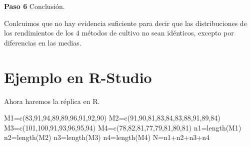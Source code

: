\documentclass[
  a4paper,
  oneside,
  openany]{book}
\newenvironment{Shaded}{\begin{snugshade}}{\end{snugshade}}
\newcommand{\DecValTok}[1]{\textcolor[rgb]{0.00,0.00,0.81}{#1}}
\newcommand{\FunctionTok}[1]{\textcolor[rgb]{0.00,0.00,0.00}{#1}}
\newcommand{\NormalTok}[1]{#1}
\newcommand{\OtherTok}[1]{\textcolor[rgb]{0.56,0.35,0.01}{#1}}
\newcommand{\SpecialCharTok}[1]{\textcolor[rgb]{0.00,0.00,0.00}{#1}}
\begin{document}
\textbf{Paso 6} Conclusión.

Conlcuimos que no hay evidencia suficiente para decir que las distribuciones de los rendimientos de los 4 métodos de cultivo no sean idénticos, excepto por diferencias en las medias.

\hypertarget{ejemplo-en-r-studio-8}{%
\section{Ejemplo en R-Studio}\label{ejemplo-en-r-studio-8}}

Ahora haremos la réplica en R.

\begin{Shaded}
\begin{Highlighting}[]
\NormalTok{M1}\OtherTok{=}\FunctionTok{c}\NormalTok{(}\DecValTok{83}\NormalTok{,}\DecValTok{91}\NormalTok{,}\DecValTok{94}\NormalTok{,}\DecValTok{89}\NormalTok{,}\DecValTok{89}\NormalTok{,}\DecValTok{96}\NormalTok{,}\DecValTok{91}\NormalTok{,}\DecValTok{92}\NormalTok{,}\DecValTok{90}\NormalTok{)}
\NormalTok{M2}\OtherTok{=}\FunctionTok{c}\NormalTok{(}\DecValTok{91}\NormalTok{,}\DecValTok{90}\NormalTok{,}\DecValTok{81}\NormalTok{,}\DecValTok{83}\NormalTok{,}\DecValTok{84}\NormalTok{,}\DecValTok{83}\NormalTok{,}\DecValTok{88}\NormalTok{,}\DecValTok{91}\NormalTok{,}\DecValTok{89}\NormalTok{,}\DecValTok{84}\NormalTok{)}
\NormalTok{M3}\OtherTok{=}\FunctionTok{c}\NormalTok{(}\DecValTok{101}\NormalTok{,}\DecValTok{100}\NormalTok{,}\DecValTok{91}\NormalTok{,}\DecValTok{93}\NormalTok{,}\DecValTok{96}\NormalTok{,}\DecValTok{95}\NormalTok{,}\DecValTok{94}\NormalTok{)}
\NormalTok{M4}\OtherTok{=}\FunctionTok{c}\NormalTok{(}\DecValTok{78}\NormalTok{,}\DecValTok{82}\NormalTok{,}\DecValTok{81}\NormalTok{,}\DecValTok{77}\NormalTok{,}\DecValTok{79}\NormalTok{,}\DecValTok{81}\NormalTok{,}\DecValTok{80}\NormalTok{,}\DecValTok{81}\NormalTok{)}
\NormalTok{n1}\OtherTok{=}\FunctionTok{length}\NormalTok{(M1)}
\NormalTok{n2}\OtherTok{=}\FunctionTok{length}\NormalTok{(M2)}
\NormalTok{n3}\OtherTok{=}\FunctionTok{length}\NormalTok{(M3)}
\NormalTok{n4}\OtherTok{=}\FunctionTok{length}\NormalTok{(M4)}
\NormalTok{N}\OtherTok{=}\NormalTok{n1}\SpecialCharTok{+}\NormalTok{n2}\SpecialCharTok{+}\NormalTok{n3}\SpecialCharTok{+}\NormalTok{n4}


\end{Highlighting}
\end{Shaded}
\end{document}
